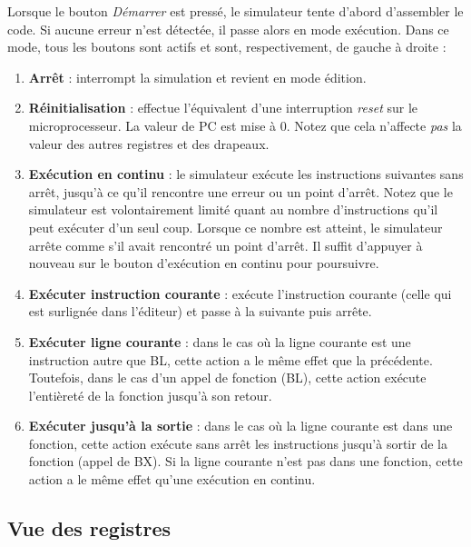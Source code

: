 \documentclass{tufte-handout}
\begin{document}
Lorsque le bouton \textit{Démarrer} est pressé, le simulateur tente d'abord d'assembler le code. Si aucune erreur n'est détectée, il passe alors en mode exécution. Dans ce mode, tous les boutons sont actifs et sont, respectivement, de gauche à droite :
\begin{enumerate}
	\item \textbf{Arrêt} : interrompt la simulation et revient en mode édition.
	\item \textbf{Réinitialisation} : effectue l'équivalent d'une interruption \emph{reset} sur le microprocesseur. La valeur de PC est mise à $0$. Notez que cela n'affecte \emph{pas} la valeur des autres registres et des drapeaux.
	\item \textbf{Exécution en continu} : le simulateur exécute les instructions suivantes sans arrêt, jusqu'à ce qu'il rencontre une erreur ou un point d'arrêt. Notez que le simulateur est volontairement limité quant au nombre d'instructions qu'il peut exécuter d'un seul coup. Lorsque ce nombre est atteint, le simulateur arrête comme s'il avait rencontré un point d'arrêt. Il suffit d'appuyer à nouveau sur le bouton d'exécution en continu pour poursuivre.
	\item \textbf{Exécuter instruction courante} : exécute l'instruction courante (celle qui est surlignée dans l'éditeur) et passe à la suivante puis arrête.
	\item \textbf{Exécuter ligne courante} : dans le cas où la ligne courante est une instruction autre que BL, cette action a le même effet que la précédente. Toutefois, dans le cas d'un appel de fonction (BL), cette action exécute l'entièreté de la fonction jusqu'à son retour.
	\item \textbf{Exécuter jusqu'à la sortie} : dans le cas où la ligne courante est dans une fonction, cette action exécute sans arrêt les instructions jusqu'à sortir de la fonction (appel de BX). Si la ligne courante n'est pas dans une fonction, cette action a le même effet qu'une exécution en continu.
\end{enumerate}

\clearpage

\subsection{Vue des registres}
\end{document}
